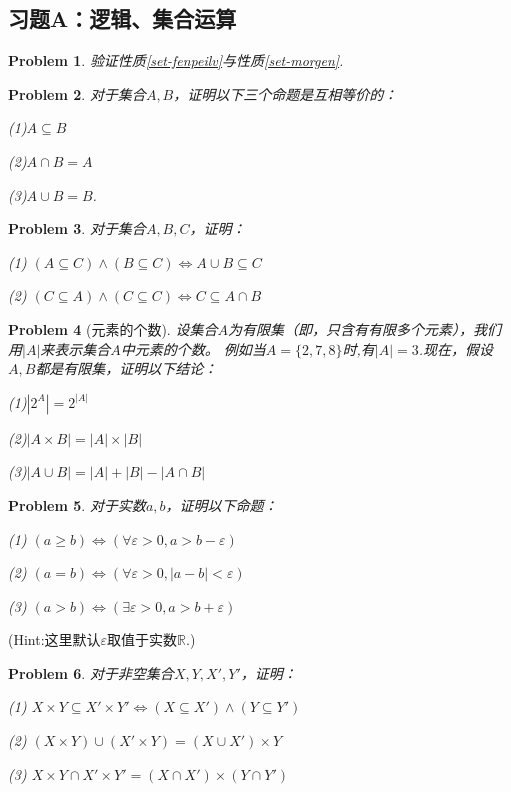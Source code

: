 \documentclass[a4paper, 11pt]{article} %
\newcommand*{\vs}{\vspace{5pt}}
\newtheorem{prob}{Problem}[subsection]
\begin{document}
\subsection{习题A：逻辑、集合运算}

\begin{prob}验证性质\ref{set-fenpeilv}与性质\ref{set-morgen}.
\end{prob}\vs

\begin{prob}对于集合$A,B$，证明以下三个命题是互相等价的：

(1)$A\subseteq B$

(2)$A\cap B=A$

(3)$A\cup B=B$.
\end{prob}
\vs

\begin{prob}对于集合$A,B,C$，证明：

(1) $(A\subseteq C)\wedge(B\subseteq C)\Leftrightarrow A\cup B\subseteq C$

(2) $(C\subseteq A)\wedge(C\subseteq C)\Leftrightarrow C\subseteq A\cap B$
\end{prob}\vs

\begin{prob}[元素的个数]
设集合$A$为有限集（即，只含有有限多个元素），我们用$|A|$来表示集合$A$中元素的个数。
例如当$A=\{2,7,8\}$时,有$|A|=3$.现在，假设$A,B$都是有限集，证明以下结论：

(1)$|2^A|=2^{|A|}$

(2)$|A\times B|=|A|\times|B|$

(3)$|A\cup B|=|A|+|B|-|A\cap B|$
\end{prob}\vs


\begin{prob}对于实数$a,b$，证明以下命题：

(1) $(a\geq b)\Leftrightarrow(\forall\varepsilon>0,a>b-\varepsilon)$

(2) $(a=b)\Leftrightarrow(\forall\varepsilon>0,|a-b|<\varepsilon)$

(3) $(a>b)\Leftrightarrow(\exists\varepsilon>0,a>b+\varepsilon)$

\end{prob}

(Hint:这里默认$\varepsilon$取值于实数$\mathbb{R}$.)\vs

\begin{prob}对于非空集合$X,Y,X',Y'$，证明：

(1) $X\times Y\subseteq X'\times Y' \Leftrightarrow (X\subseteq X')\wedge(Y\subseteq Y')$

(2) $(X\times Y)\cup(X'\times Y)=(X\cup X')\times Y$

(3) $X\times Y\cap X'\times Y'=(X\cap X')\times(Y\cap Y')$
\end{prob}\vs
\end{document}
